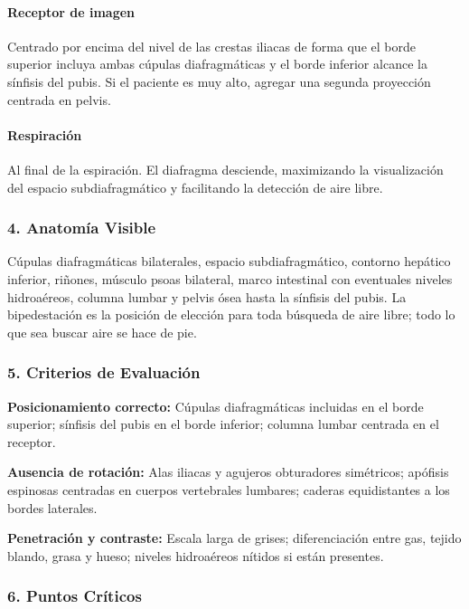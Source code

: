 	\paragraph{Receptor de imagen}
	Centrado por encima del nivel de las crestas iliacas de forma que el borde superior incluya ambas cúpulas diafragmáticas y el borde inferior alcance la sínfisis del pubis. Si el paciente es muy alto, agregar una segunda proyección centrada en pelvis.
	
	\paragraph{Respiración}
	Al final de la espiración. El diafragma desciende, maximizando la visualización del espacio subdiafragmático y facilitando la detección de aire libre.
	
	\subsubsection*{4. Anatomía Visible}
	
	Cúpulas diafragmáticas bilaterales, espacio subdiafragmático, contorno hepático inferior, riñones, músculo psoas bilateral, marco intestinal con eventuales niveles hidroaéreos, columna lumbar y pelvis ósea hasta la sínfisis del pubis. La bipedestación es la posición de elección para toda búsqueda de aire libre; todo lo que sea buscar aire se hace de pie.
	
	\subsubsection*{5. Criterios de Evaluación}
	
	\textbf{Posicionamiento correcto:} Cúpulas diafragmáticas incluidas en el borde superior; sínfisis del pubis en el borde inferior; columna lumbar centrada en el receptor.
	
	\textbf{Ausencia de rotación:} Alas iliacas y agujeros obturadores simétricos; apófisis espinosas centradas en cuerpos vertebrales lumbares; caderas equidistantes a los bordes laterales.
	
	\textbf{Penetración y contraste:} Escala larga de grises; diferenciación entre gas, tejido blando, grasa y hueso; niveles hidroaéreos nítidos si están presentes.
	
	\subsubsection*{6. Puntos Críticos}
	
